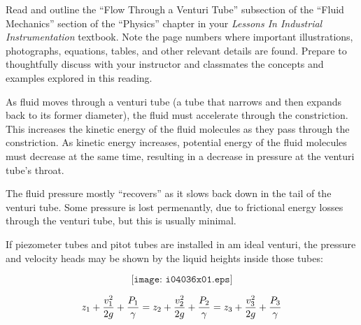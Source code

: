 

Read and outline the ``Flow Through a Venturi Tube'' subsection of the ``Fluid Mechanics'' section of the ``Physics'' chapter in your {\it Lessons In Industrial Instrumentation} textbook.  Note the page numbers where important illustrations, photographs, equations, tables, and other relevant details are found.  Prepare to thoughtfully discuss with your instructor and classmates the concepts and examples explored in this reading.














As fluid moves through a venturi tube (a tube that narrows and then expands back to its former diameter), the fluid must accelerate through the constriction.  This increases the kinetic energy of the fluid molecules as they pass through the constriction.  As kinetic energy increases, potential energy of the fluid molecules must decrease at the same time, resulting in a decrease in pressure at the venturi tube's throat.

\vskip 10pt

The fluid pressure mostly ``recovers'' as it slows back down in the tail of the venturi tube.  Some pressure is lost permenantly, due to frictional energy losses through the venturi tube, but this is usually minimal.

\vskip 10pt

If piezometer tubes and pitot tubes are installed in am ideal venturi, the pressure and velocity heads may be shown by the liquid heights inside those tubes:

$$\texttt{[image: i04036x01.eps]}$$

$$z_1 + {v_1^2 \over {2 g}} + {P_1 \over \gamma} = z_2 + {v_2^2 \over {2 g}} + {P_2 \over \gamma} = z_3 + {v_3^2 \over {2 g}} + {P_3 \over \gamma}$$














